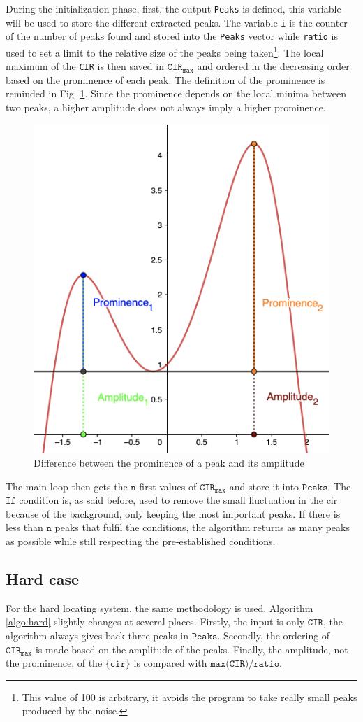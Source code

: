 During the initialization phase, first, the output \texttt{Peaks} is defined, this variable will be used to store the different extracted peaks. The variable \texttt{i} is the counter of the number of peaks found and stored into the \texttt{Peaks} vector while \texttt{ratio} is used to set a limit to the relative size of the peaks being taken\footnote{This value of 100 is arbitrary, it avoids the program to take really small peaks produced by the noise.}. The local maximum of the \texttt{CIR} is then saved in $\texttt{CIR}_\texttt{max}$ and ordered in the decreasing order based on the prominence of each peak. The definition of the prominence is reminded in Fig. \ref{fig:prominence}. Since the prominence depends on the local minima between two peaks, a higher amplitude does not always imply a higher prominence.

\begin{figure}[H]
\centering
\includegraphics[width=.35\linewidth]{Images/prominence.png}
\caption{Difference between the prominence of a peak and its amplitude \label{fig:prominence}}
\end{figure}

The main loop then gets the $\texttt{n}$ first values of $\texttt{CIR}_\texttt{max}$ and store it into $\texttt{Peaks}$. The $\texttt{If}$ condition is, as said before, used to remove the small fluctuation in the \gls{cir} because of the background, only keeping the most important peaks. If there is less than $\texttt{n}$ peaks that fulfil the conditions, the algorithm returns as many peaks as possible while still respecting the pre-established conditions.

\subsection{Hard case}

For the hard locating system, the same methodology is used. Algorithm \ref{algo:hard} slightly changes at several places. Firstly, the input is only $\texttt{CIR}$, the algorithm always gives back three peaks in $\texttt{Peaks}$. Secondly, the ordering of $\texttt{CIR}_\texttt{max}$ is made based on the amplitude of the peaks. Finally, the amplitude, not the prominence, of the $\{\texttt{cir}\}$  is compared with $\texttt{max(CIR)}/\texttt{ratio}$.
\vspace{2mm}

